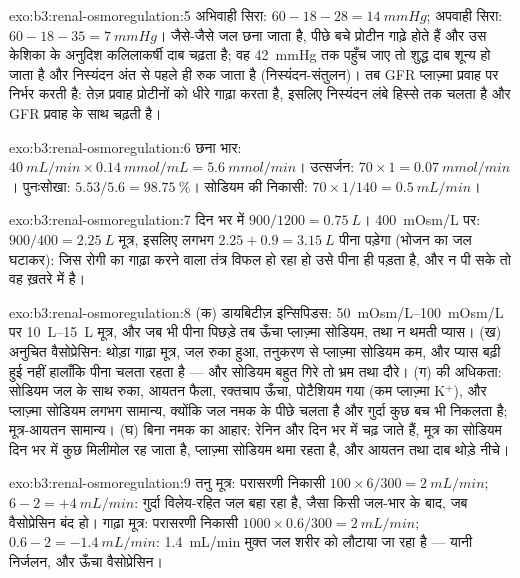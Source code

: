 \begin{solution}{exo:b3:renal-osmoregulation:5}
अभिवाही सिरा: $60 - 18 - 28 = \qty{14}{mmHg}$; अपवाही सिरा: $60 - 18 -
35 = \qty{7}{mmHg}$। जैसे-जैसे जल छना जाता है, पीछे बचे प्रोटीन गाढ़े
होते हैं और उस केशिका के अनुदिश कलिलाकर्षी दाब चढ़ता है; वह
\qty{42}{mmHg} तक पहुँच जाए तो शुद्ध दाब शून्य हो जाता है और निस्यंदन
अंत से पहले ही रुक जाता है (निस्यंदन-संतुलन)। तब GFR प्लाज़्मा प्रवाह
पर निर्भर करती है: तेज़ प्रवाह प्रोटीनों को धीरे गाढ़ा करता है, इसलिए
निस्यंदन लंबे हिस्से तक चलता है और GFR प्रवाह के साथ चढ़ती है।
\end{solution}

\begin{solution}{exo:b3:renal-osmoregulation:6}
छना भार: $\qty{40}{mL/min}\times\qty{0.14}{mmol/mL} =
\qty{5.6}{mmol/min}$। उत्सर्जन: $70\times 1 = \qty{0.07}{mmol/min}$।
पुनःसोखा: $5.53/5.6 = \qty{98.75}{\%}$। सोडियम की निकासी: $70\times
1/140 = \qty{0.5}{mL/min}$।
\end{solution}

\begin{solution}{exo:b3:renal-osmoregulation:7}
दिन भर में $900/1200 = \qty{0.75}{L}$। \qty{400}{mOsm/L} पर: $900/400 =
\qty{2.25}{L}$ मूत्र, इसलिए लगभग $2.25 + 0.9 = \qty{3.15}{L}$ पीना
पड़ेगा (भोजन का जल घटाकर): जिस रोगी का गाढ़ा करने वाला तंत्र विफल हो
रहा हो उसे पीना ही पड़ता है, और न पी सके तो वह ख़तरे में है।
\end{solution}

\begin{solution}{exo:b3:renal-osmoregulation:8}
(क) डायबिटीज़ इन्सिपिडस: \qtyrange{50}{100}{mOsm/L} पर
\qtyrange{10}{15}{L} मूत्र, और जब भी पीना पिछड़े तब ऊँचा प्लाज़्मा
सोडियम, तथा न थमती प्यास। (ख) अनुचित वैसोप्रेसिन: थोड़ा गाढ़ा मूत्र,
जल रुका हुआ, तनुकरण से प्लाज़्मा सोडियम कम, और प्यास बढ़ी हुई नहीं
हालाँकि पीना चलता रहता है --- और सोडियम बहुत गिरे तो भ्रम तथा दौरे।
(ग)  की अधिकता: सोडियम जल के साथ रुका, आयतन फैला, रक्तचाप
ऊँचा, पोटैशियम गया (कम प्लाज़्मा K$^{+}$), और प्लाज़्मा सोडियम लगभग
सामान्य, क्योंकि जल नमक के पीछे चलता है और गुर्दा कुछ बच भी निकलता है;
मूत्र-आयतन सामान्य। (घ) बिना नमक का आहार: रेनिन और  दिन भर
में चढ़ जाते हैं, मूत्र का सोडियम दिन भर में कुछ मिलीमोल रह जाता है,
प्लाज़्मा सोडियम थमा रहता है, और आयतन तथा दाब थोड़े नीचे।
\end{solution}

\begin{solution}{exo:b3:renal-osmoregulation:9}
तनु मूत्र: परासरणी निकासी $100\times 6/300 = \qty{2}{mL/min}$;
 $6 - 2 = +\qty{4}{mL/min}$: गुर्दा विलेय-रहित जल बहा
रहा है, जैसा किसी जल-भार के बाद, जब वैसोप्रेसिन बंद हो।
गाढ़ा मूत्र: परासरणी निकासी $1000\times 0.6/300 =
\qty{2}{mL/min}$;  $0.6 - 2 = -\qty{1.4}{mL/min}$:
\qty{1.4}{mL/min} मुक्त जल शरीर को लौटाया जा रहा है --- यानी निर्जलन,
और ऊँचा वैसोप्रेसिन।
\end{solution}

